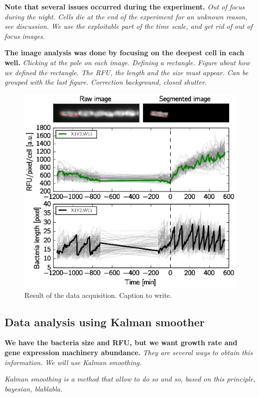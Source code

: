 \textbf{Note that several issues occurred during the experiment.
}\textit{
Out of focus during the night.
Cells die at the end of the experiment for an unknown reason, see discussion.
We use the exploitable part of the time scale, and get rid of out of focus images.
}

\textbf{The image analysis was done by focusing on the deepest cell in each well.
}\textit{Clicking at the pole on each image.
Defining a rectangle.
Figure about how we defined the rectangle.
The RFU, the length and the size must appear. Can be grouped with the last figure.
Correction background, closed shutter.
}

\begin{figure}[h!]
\centering
\includegraphics[scale=1]{./Fig/data_acquisition}
\caption{Result of the data acquisition. Caption to write.}
\label{fig:data_acquisition}
\end{figure}

\subsection{Data analysis using Kalman smoother}

\textbf{We have the bacteria size and RFU, but we want growth rate and gene expression machinery abundance.}
\textit{
They are several ways to obtain this information.
We will use Kalman smoothing.
}

\textit{
Kalman smoothing is a method that allow to do so and so, based on this principle, bayesian, blablabla.
}

